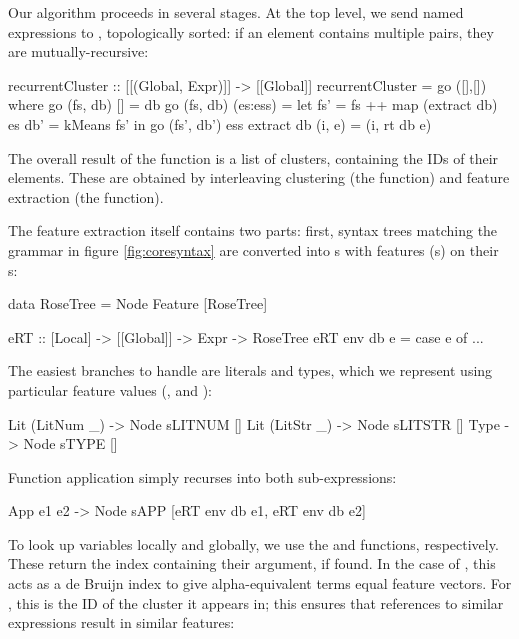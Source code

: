 Our algorithm proceeds in several stages. At the top level, we send named expressions to , topologically sorted: if an element contains multiple  pairs, they are mutually-recursive:

\begin{haskell}
recurrentCluster :: [[(Global, Expr)]] -> [[Global]]
recurrentCluster = go ([],[])
  where go (fs, db) []       = db
        go (fs, db) (es:ess) = let fs' = fs ++ map (extract db) es
                                   db' = kMeans fs'
                                in go (fs', db') ess
        extract db (i, e) = (i, rt db e)
\end{haskell}

The overall result of the  function is a list of clusters, containing the IDs of their elements. These are obtained by interleaving clustering (the  function) and feature extraction (the  function).

The feature extraction itself contains two parts: first, syntax trees matching the grammar in figure \ref{fig:coresyntax} are converted into s with features (s) on their s:

\begin{haskell}
data RoseTree = Node Feature [RoseTree]

eRT :: [Local] -> [[Global]] -> Expr -> RoseTree
eRT env db e = case e of
  ...
\end{haskell}

The easiest branches to handle are literals and types, which we represent using particular feature values (,  and ):

\begin{haskell}
  Lit (LitNum _) -> Node sLITNUM []
  Lit (LitStr _) -> Node sLITSTR []
  Type           -> Node sTYPE   []
\end{haskell}

Function application simply recurses into both sub-expressions:

\begin{haskell}
  App e1 e2 -> Node sAPP [eRT env db e1,
                          eRT env db e2]
\end{haskell}

To look up variables locally and globally, we use the  and  functions, respectively. These return the index containing their argument, if found. In the case of , this acts as a de Bruijn index to give alpha-equivalent terms equal feature vectors. For , this is the ID of the cluster it appears in; this ensures that references to similar expressions result in similar features:

